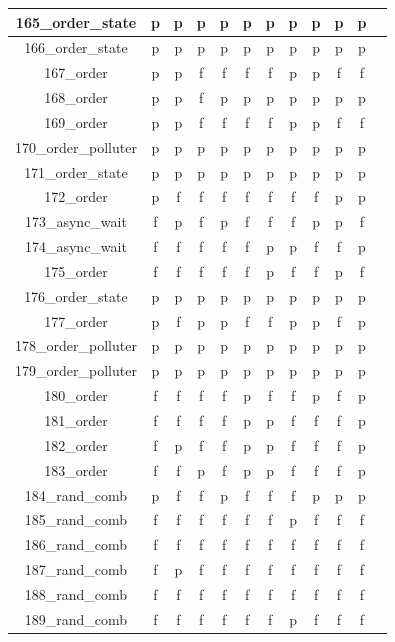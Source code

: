 \documentclass[
fancyheadings, %
%
%
]{stsreprt}
\begin{document}
\begin{longtable}{|c|c|c|c|c|c|c|c|c|c|c|c|}
\hline
165\_order\_state & p & p & p & p & p & p & p & p & p & p \\
\hline
166\_order\_state & p & p & p & p & p & p & p & p & p & p \\
\hline
167\_order & p & p & f & f & f & f & p & p & f & f \\
\hline
168\_order & p & p & f & p & p & p & p & p & p & p \\
\hline
169\_order & p & p & f & f & f & f & p & p & f & f \\
\hline
170\_order\_polluter & p & p & p & p & p & p & p & p & p & p \\
\hline
171\_order\_state & p & p & p & p & p & p & p & p & p & p \\
\hline
172\_order & p & f & f & f & f & f & f & f & p & p \\
\hline
173\_async\_wait & f & p & f & p & f & f & f & p & p & f \\
\hline
174\_async\_wait & f & f & f & f & f & p & p & f & f & p \\
\hline
175\_order & f & f & f & f & f & p & f & f & p & f \\
\hline
176\_order\_state & p & p & p & p & p & p & p & p & p & p \\
\hline
177\_order & p & f & p & p & f & f & p & p & f & p \\
\hline
178\_order\_polluter & p & p & p & p & p & p & p & p & p & p \\
\hline
179\_order\_polluter & p & p & p & p & p & p & p & p & p & p \\
\hline
180\_order & f & f & f & f & p & f & f & p & f & p \\
\hline
181\_order & f & f & f & f & p & p & f & f & f & p \\
\hline
182\_order & f & p & f & f & p & p & f & f & f & p \\
\hline
183\_order & f & f & p & f & p & p & f & f & f & p \\
\hline
184\_rand\_comb & p & f & f & p & f & f & f & p & p & p \\
\hline
185\_rand\_comb & f & f & f & f & f & f & p & f & f & f \\
\hline
186\_rand\_comb  & f & f & f & f & f & f & f & f & f & f \\
\hline
187\_rand\_comb & f & p & f & f & f & f & f & f & f & f \\
\hline
188\_rand\_comb  & f & f & f & f & f & f & f & f & f & f \\
\hline
189\_rand\_comb & f & f & f & f & f & f & p & f & f & f \\

\end{longtable}
\end{document}

